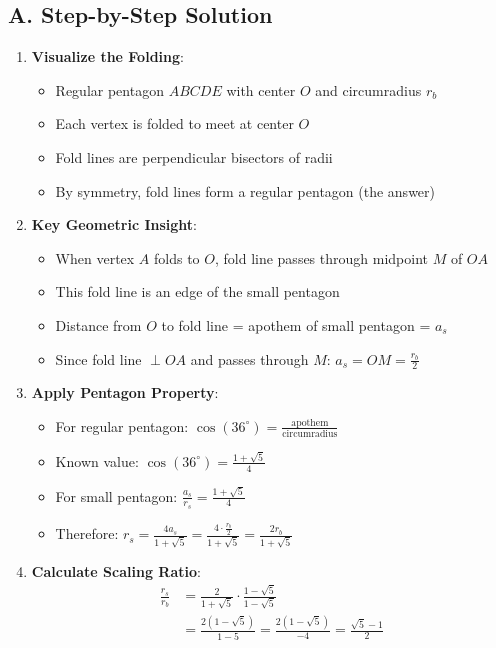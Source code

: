 \documentclass[12pt]{article}
\begin{document}
\begin{solutionbox}
\subsection*{A. Step-by-Step Solution}
\begin{enumerate}[leftmargin=*]
    \item \textbf{Visualize the Folding}: 
    \begin{itemize}
        \item Regular pentagon $ABCDE$ with center $O$ and circumradius $r_b$
        \item Each vertex is folded to meet at center $O$
        \item Fold lines are perpendicular bisectors of radii
        \item By symmetry, fold lines form a regular pentagon (the answer)
    \end{itemize}
    
    \item \textbf{Key Geometric Insight}: 
    \begin{itemize}
        \item When vertex $A$ folds to $O$, fold line passes through midpoint $M$ of $OA$
        \item This fold line is an edge of the small pentagon
        \item Distance from $O$ to fold line = apothem of small pentagon = $a_s$
        \item Since fold line $\perp OA$ and passes through $M$: $a_s = OM = \frac{r_b}{2}$
    \end{itemize}
    
    \item \textbf{Apply Pentagon Property}: 
    \begin{itemize}
        \item For regular pentagon: $\cos(36^\circ) = \frac{\text{apothem}}{\text{circumradius}}$
        \item Known value: $\cos(36^\circ) = \frac{1+\sqrt{5}}{4}$
        \item For small pentagon: $\frac{a_s}{r_s} = \frac{1+\sqrt{5}}{4}$
        \item Therefore: $r_s = \frac{4a_s}{1+\sqrt{5}} = \frac{4 \cdot \frac{r_b}{2}}{1+\sqrt{5}} = \frac{2r_b}{1+\sqrt{5}}$
    \end{itemize}
    
    \item \textbf{Calculate Scaling Ratio}: 
    \begin{align*}
    \frac{r_s}{r_b} &= \frac{2}{1+\sqrt{5}} \cdot \frac{1-\sqrt{5}}{1-\sqrt{5}}\\
    &= \frac{2(1-\sqrt{5})}{1-5} = \frac{2(1-\sqrt{5})}{-4} = \frac{\sqrt{5}-1}{2}
    \end{align*}
    

\end{enumerate}
\end{solutionbox}
\end{document}
